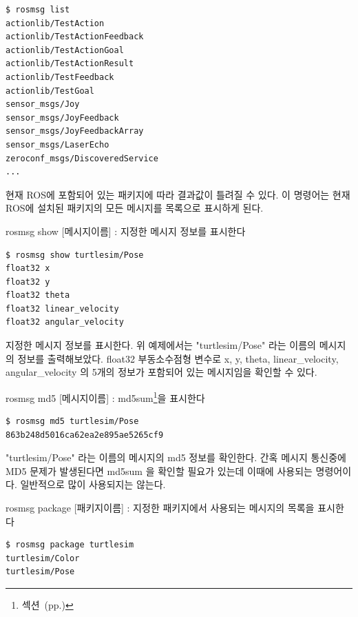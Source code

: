 \begin{lstlisting}[language=ROS]
$ rosmsg list
actionlib/TestAction
actionlib/TestActionFeedback
actionlib/TestActionGoal
actionlib/TestActionResult
actionlib/TestFeedback
actionlib/TestGoal
sensor_msgs/Joy
sensor_msgs/JoyFeedback
sensor_msgs/JoyFeedbackArray
sensor_msgs/LaserEcho
zeroconf_msgs/DiscoveredService
...
\end{lstlisting}

\noindent
현재 ROS에 포함되어 있는 패키지에 따라 결과값이 틀려질 수 있다. 이 명령어는 현재 ROS에 설치된 패키지의 모든 메시지를 목록으로 표시하게 된다.

\vspace{\baselineskip}
\noindent
{}\circled{\thenum} rosmsg show [메시지이름] : 지정한 메시지 정보를 표시한다

\begin{lstlisting}[language=ROS]
$ rosmsg show turtlesim/Pose 
float32 x
float32 y
float32 theta
float32 linear_velocity
float32 angular_velocity
\end{lstlisting}

\noindent
지정한 메시지 정보를 표시한다. 위 예제에서는 "turtlesim/Pose" 라는 이름의 메시지의 정보를 출력해보았다. float32 부동소수점형 변수로 x, y, theta, linear\_velocity, angular\_velocity 의 5개의 정보가 포함되어 있는 메시지임을 확인할 수 있다.

\vspace{\baselineskip}
\noindent
{}\circled{\thenum} rosmsg md5 [메시지이름] : md5sum\footnote{섹션~(pp.\pageref{def:RosMD5})}을 표시한다

\begin{lstlisting}[language=ROS]
$ rosmsg md5 turtlesim/Pose 
863b248d5016ca62ea2e895ae5265cf9
\end{lstlisting}

\noindent
"turtlesim/Pose" 라는 이름의 메시지의 md5 정보를 확인한다. 간혹 메시지 통신중에 MD5 문제가 발생된다면 md5sum 을 확인할 필요가 있는데 이때에 사용되는 명령어이다. 일반적으로 많이 사용되지는 않는다.

\vspace{\baselineskip}
\noindent
{}\circled{\thenum} rosmsg package [패키지이름] : 지정한 패키지에서 사용되는 메시지의 목록을 표시한다

\begin{lstlisting}[language=ROS]
$ rosmsg package turtlesim 
turtlesim/Color
turtlesim/Pose
\end{lstlisting}

